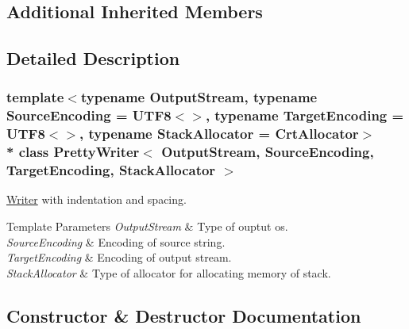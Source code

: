 \subsection*{Additional Inherited Members}


\subsection{Detailed Description}
\subsubsection*{template$<$typename Output\+Stream, typename Source\+Encoding = U\+T\+F8$<$$>$, typename Target\+Encoding = U\+T\+F8$<$$>$, typename Stack\+Allocator = Crt\+Allocator$>$\\*
class Pretty\+Writer$<$ Output\+Stream, Source\+Encoding, Target\+Encoding, Stack\+Allocator $>$}

\hyperlink{class_writer}{Writer} with indentation and spacing. 


\begin{DoxyTemplParams}{Template Parameters}
{\em Output\+Stream} & Type of ouptut os. \\
\hline
{\em Source\+Encoding} & Encoding of source string. \\
\hline
{\em Target\+Encoding} & Encoding of output stream. \\
\hline
{\em Stack\+Allocator} & Type of allocator for allocating memory of stack. \\
\hline
\end{DoxyTemplParams}


\subsection{Constructor \& Destructor Documentation}

